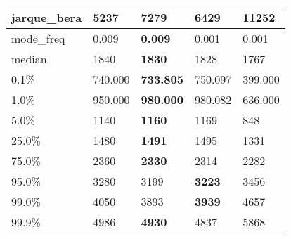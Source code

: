 \begin{table}[H]
\begin{tabular}{|l|m{10em}|m{10em}|m{10em}|m{10em}|}
\hline jarque\_bera & 5237 & 7279 & \bfseries 6429 & \cellcolor[rgb]{0.9, 0.54, 0.52} 11252 \\
\hline mode\_freq & 0.009 & \bfseries 0.009 & \cellcolor[rgb]{0.9, 0.54, 0.52} 0.001 & 0.001 \\
\hline median & 1840 & \bfseries 1830 & 1828 & \cellcolor[rgb]{0.9, 0.54, 0.52} 1767 \\
\hline 0.1\% & 740.000 & \bfseries 733.805 & 750.097 & \cellcolor[rgb]{0.9, 0.54, 0.52} 399.000 \\
\hline 1.0\% & 950.000 & \bfseries 980.000 & 980.082 & \cellcolor[rgb]{0.9, 0.54, 0.52} 636.000 \\
\hline 5.0\% & 1140 & \bfseries 1160 & 1169 & \cellcolor[rgb]{0.9, 0.54, 0.52} 848 \\
\hline 25.0\% & 1480 & \bfseries 1491 & 1495 & \cellcolor[rgb]{0.9, 0.54, 0.52} 1331 \\
\hline 75.0\% & 2360 & \bfseries 2330 & 2314 & \cellcolor[rgb]{0.9, 0.54, 0.52} 2282 \\
\hline 95.0\% & 3280 & 3199 & \bfseries 3223 & \cellcolor[rgb]{0.9, 0.54, 0.52} 3456 \\
\hline 99.0\% & 4050 & 3893 & \bfseries 3939 & \cellcolor[rgb]{0.9, 0.54, 0.52} 4657 \\
\hline 99.9\% & 4986 & \bfseries 4930 & 4837 & \cellcolor[rgb]{0.9, 0.54, 0.52} 5868 \\
\hline
\end{tabular}
\end{table}
